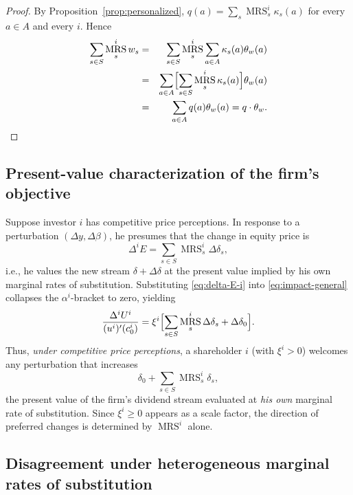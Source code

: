 \documentclass[11pt,a4paper,oneside]{book}
\def\geq{\geqslant}
\DeclareMathOperator{\MRS}{MRS}
\theoremstyle{plain}
\theoremstyle{definition}
\theoremstyle{remark}
\numberwithin{equation}{chapter}
\begin{document}
\begin{proof}
By Proposition~\ref{prop:personalized}, $q(a) = \sum_s \MRS^i_s \kappa_s(a)$ for every $a \in A$ and every $i$.
Hence
\begin{eqnarray*}
  \sum_{s \in S} \MRS^i_s w_s
  & = & \sum_{s \in S} \MRS^i_s \sum_{a \in A} \kappa_s(a) \theta_w(a) \\
  & = & \sum_{a \in A} \Bigl[ \sum_{s \in S} \MRS^i_s \kappa_s(a) \Bigr] \theta_w(a) \\
  & = & \sum_{a \in A} q(a) \theta_w(a) = q \cdot \theta_w. \qedhere
\end{eqnarray*}
\end{proof}

\subsection{Present-value characterization of the firm's objective}

Suppose investor $i$ has competitive price perceptions.
In response to a perturbation $(\Delta y, \Delta \beta)$, he presumes that the change in equity price is
\begin{equation}\label{eq:delta-E-i}
  \Delta^i E = \sum_{s \in S} \MRS^i_s \Delta \delta_s,
\end{equation}
i.e., he values the new stream $\delta + \Delta \delta$ at the present value implied by his own marginal rates of substitution.
Substituting \eqref{eq:delta-E-i} into \eqref{eq:impact-general} collapses the $\alpha^i$-bracket to zero, yielding
\begin{equation}\label{eq:impact-cpp}
  \frac{\Delta^i U^i}{(u^i)'(c^i_0)}
  = \xi^i \Bigl[ \sum_{s \in S} \MRS^i_s \Delta \delta_s + \Delta \delta_0 \Bigr].
\end{equation}
Thus, \emph{under competitive price perceptions}, a shareholder $i$ (with $\xi^i > 0$) welcomes any perturbation that increases
\begin{equation*}
  \delta_0 + \sum_{s \in S} \MRS^i_s \delta_s,
\end{equation*}
the present value of the firm's dividend stream evaluated at \emph{his own} marginal rate of substitution.
Since $\xi^i \geq 0$ appears as a scale factor, the direction of preferred changes is determined by $\MRS^i$ alone.

\subsection{Disagreement under heterogeneous marginal rates of substitution}
\end{document}

